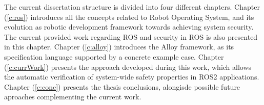 The current dissertation structure is divided into four different chapters. Chapter (\ref{c:ros}) introduces all the concepts related to Robot Operating System, and its evolution as robotic development framework towards achieving system security. The current provided work regarding ROS and security in ROS is also presented in this chapter. Chapter (\ref{c:alloy}) introduces the Alloy framework, as its specification language supported by a concrete example case. Chapter (\ref{c:currWork}) presents the approach developed during this work, which allows
the automatic verification of system-wide safety properties in ROS2 applications. Chapter (\ref{c:conc}) presents the thesis conclusions, alongisde possible future aproaches complementing the current work.